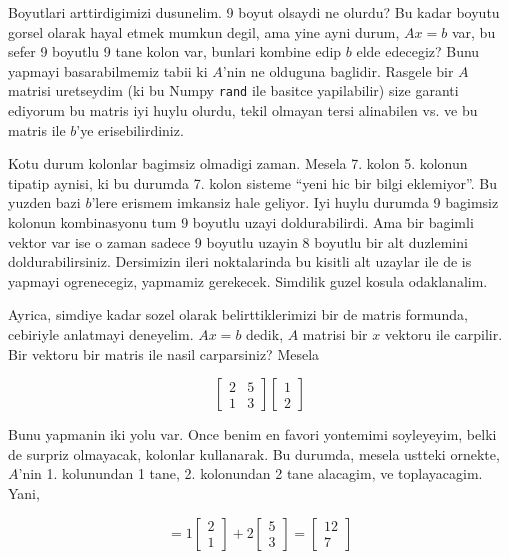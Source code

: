 \documentclass[12pt,fleqn]{article}\usepackage{../common}
\begin{document}
Boyutlari arttirdigimizi dusunelim. 9 boyut olsaydi ne olurdu? Bu kadar
boyutu gorsel olarak hayal etmek mumkun degil, ama yine ayni durum, $Ax=b$
var, bu sefer 9 boyutlu 9 tane kolon var, bunlari kombine edip $b$ elde
edecegiz? Bunu yapmayi basarabilmemiz tabii ki $A$'nin ne olduguna
baglidir. Rasgele bir $A$ matrisi uretseydim (ki bu Numpy \verb!rand! ile
basitce yapilabilir) size garanti ediyorum bu matris iyi huylu olurdu,
tekil olmayan tersi alinabilen vs. ve bu matris ile $b$'ye
erisebilirdiniz. 

Kotu durum kolonlar bagimsiz olmadigi zaman. Mesela 7. kolon 5. kolonun
tipatip aynisi, ki bu durumda 7. kolon sisteme ``yeni hic bir bilgi
eklemiyor''. Bu yuzden bazi $b$'lere erismem imkansiz hale geliyor. Iyi
huylu durumda 9 bagimsiz kolonun kombinasyonu tum 9 boyutlu uzayi
doldurabilirdi. Ama bir bagimli vektor var ise o zaman sadece 9 boyutlu
uzayin 8 boyutlu bir alt duzlemini doldurabilirsiniz. Dersimizin ileri
noktalarinda bu kisitli alt uzaylar ile de is yapmayi ogrenecegiz, yapmamiz
gerekecek. Simdilik guzel kosula odaklanalim.  

Ayrica, simdiye kadar sozel olarak belirttiklerimizi bir de matris
formunda, cebiriyle anlatmayi deneyelim. $Ax=b$ dedik, $A$ matrisi bir $x$
vektoru ile carpilir. Bir vektoru bir matris ile nasil carparsiniz? Mesela

$$ 
\left[\begin{array}{rr}
2 & 5 \\
1 & 3
\end{array}\right]
\left[\begin{array}{r}
1 \\
2
\end{array}\right]
 $$

Bunu yapmanin iki yolu var. Once benim en favori yontemimi soyleyeyim,
belki de surpriz olmayacak, kolonlar kullanarak. Bu durumda, mesela ustteki
ornekte, $A$'nin 1. kolunundan 1 tane, 2. kolonundan 2 tane alacagim, ve
toplayacagim. Yani,

$$ =
1
\left[\begin{array}{r}
2 \\
1
\end{array}\right]
+
2
\left[\begin{array}{r}
5 \\
3
\end{array}\right]
=
\left[\begin{array}{r}
12 \\
7
\end{array}\right]
 $$
\end{document}
